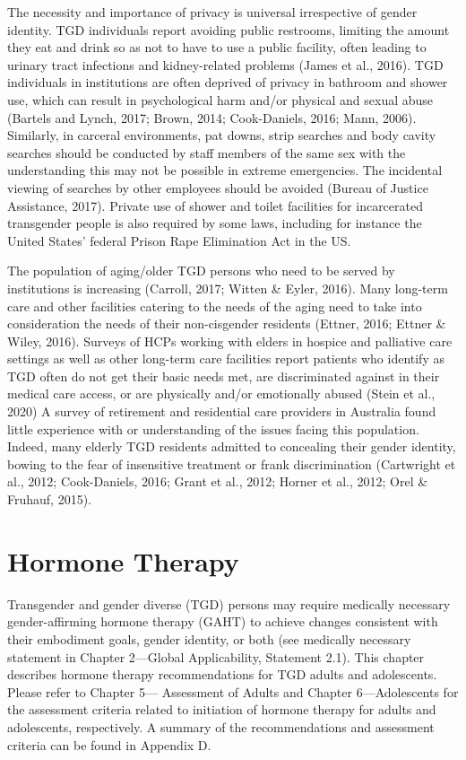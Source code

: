 \documentclass[
]{book}
\begin{document}
The necessity and importance of privacy is
universal irrespective of gender identity. TGD
individuals report avoiding public restrooms,
limiting the amount they eat and drink so as
not to have to use a public facility, often leading to urinary tract infections and kidney-related
problems (James et al., 2016). TGD individuals
in institutions are often deprived of privacy in
bathroom and shower use, which can result in
psychological harm and/or physical and sexual
abuse (Bartels and Lynch, 2017; Brown, 2014;
Cook-Daniels, 2016; Mann, 2006). Similarly, in
carceral environments, pat downs, strip searches
and body cavity searches should be conducted
by staff members of the same sex with the
understanding this may not be possible in
extreme emergencies. The incidental viewing
of searches by other employees should be
avoided (Bureau of Justice Assistance, 2017).
Private use of shower and toilet facilities for
incarcerated transgender people is also required
by some laws, including for instance the United
States' federal Prison Rape Elimination Act
in the US.

The population of aging/older TGD persons
who need to be served by institutions is increasing (Carroll, 2017; Witten \& Eyler, 2016). Many
long-term care and other facilities catering to the
needs of the aging need to take into consideration the needs of their non-cisgender residents
(Ettner, 2016; Ettner \& Wiley, 2016). Surveys of
HCPs working with elders in hospice and palliative care settings as well as other long-term care
facilities report patients who identify as TGD
often do not get their basic needs met, are discriminated against in their medical care access,
or are physically and/or emotionally abused (Stein
et al., 2020) A survey of retirement and residential care providers in Australia found little experience with or understanding of the issues facing
this population. Indeed, many elderly TGD residents admitted to concealing their gender identity, bowing to the fear of insensitive treatment
or frank discrimination (Cartwright et al., 2012;
Cook-Daniels, 2016; Grant et al., 2012; Horner
et al., 2012; Orel \& Fruhauf, 2015).

\hypertarget{hormone-therapy}{%
\chapter{Hormone Therapy}\label{hormone-therapy}}

Transgender and gender diverse (TGD) persons
may require medically necessary gender-affirming
hormone therapy (GAHT) to achieve changes
consistent with their embodiment goals, gender
identity, or both (see medically necessary statement in Chapter 2---Global Applicability,
Statement 2.1). This chapter describes hormone
therapy recommendations for TGD adults and
adolescents. Please refer to Chapter 5---
Assessment of Adults and Chapter 6---Adolescents
for the assessment criteria related to initiation
of hormone therapy for adults and adolescents,
respectively. A summary of the recommendations and assessment criteria can be found in
Appendix D.
\end{document}
